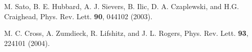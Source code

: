 
\begin{thebibliography}{99}


M. Sato, B. E. Hubbard, A. J. Sievers, B. Ilic, D. A. Czaplewski, and H.G. Craighead, Phys. Rev. Lett. \textbf{90}, 044102 (2003).


M. C. Cross, A. Zumdieck, R. Lifshitz, and J. L. Rogers, Phys. Rev. Lett. \textbf{93}, 224101 (2004).


\end{thebibliography}